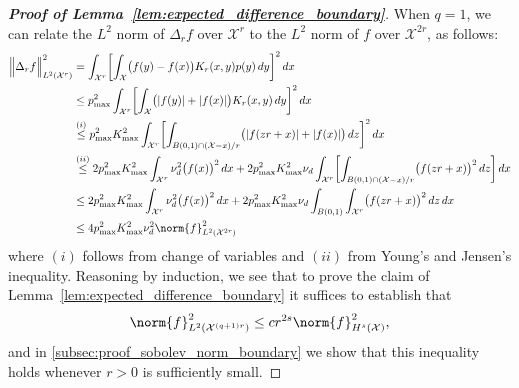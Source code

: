 \documentclass{article}
\newcommand{\abs}[1]{\left \lvert #1 \right \rvert}
\newcommand{\1}{\mathbf{1}}
\newcommand{\Xset}{\mathcal{X}}
\newcommand{\Leb}{L}
\theoremstyle{alden}
\theoremstyle{aldenthm}
\theoremstyle{definition}
\theoremstyle{remark}
\begin{document}
\begin{proof}[\textbf{Proof of Lemma~\ref{lem:expected_difference_boundary}}]
	When $q = 1$, we can relate the $\Leb^2$ norm of $\Delta_rf$ over $\Xset^r$ to the $\Leb^2$ norm of $f$ over $\Xset^{2r}$, as follows:
	\begin{align*}
	\Bigl\|\Delta_rf\Bigr\|_{\Leb^2(\Xset^r)}^2 & = \int_{\Xset^r} \biggl[\int_{\Xset} \bigl(f(y) - f(x)\bigr)K_r(x,y) p(y) \,dy \biggr]^2 \,dx \\
	& \leq p_{\max}^2 \int_{\Xset^r} \biggl[\int_{\Xset} \bigl(\abs{f(y)} +  \abs{f(x)}\bigr)K_r(x,y) \,dy \biggr]^2 \,dx \\
	& \overset{(i)}{\leq}  p_{\max}^2 K_{\max}^2 \int_{\Xset^r} \biggl[\int_{B(0,1) \cap (\Xset - x)/r} \bigl(\abs{f(zr + x)} +  \abs{f(x)}\bigr)\,dz \biggr]^2 \,dx \\
	& \overset{(ii)}{\leq} 2 p_{\max}^2 K_{\max}^2 \int_{\Xset^r} \nu_d^2 \bigl(f(x)\bigr)^2 \,dx + 2 p_{\max}^2 K_{\max}^2 \nu_d \int_{\Xset^r}\biggl[\int_{B(0,1) \cap (\Xset - x)/r} \bigl(f(zr + x)\bigr)^2\,dz\biggr] \,dx \\
	& \leq 2 p_{\max}^2 K_{\max}^2 \int_{\Xset^r} \nu_d^2 \bigl(f(x)\bigr)^2 \,dx + 2 p_{\max}^2 K_{\max}^2 \nu_d \int_{B(0,1)} \int_{\Xset^r} \bigl(f(zr + x)\bigr)^2\,dz \,dx \\
	& \leq 4 p_{\max}^2 K_{\max}^2 \nu_d^2 \norm{f}_{\Leb^2(\Xset^{2r})}^2
	\end{align*}
	where $(i)$ follows from change of variables and $(ii)$ from Young's and Jensen's inequality. Reasoning by induction, we see that to prove the claim of Lemma~\ref{lem:expected_difference_boundary} it suffices to establish that
	\begin{equation}
	\label{pf:expected_difference_boundary}
	\norm{f}_{\Leb^2(\Xset^{(q + 1)r})}^2 \leq c r^{2s} \norm{f}_{H^s(\Xset)}^2,
	\end{equation}
	and in \ref{subsec:proof_sobolev_norm_boundary} we show that this inequality holds whenever $r > 0$ is sufficiently small.
\end{proof}
\end{document}
